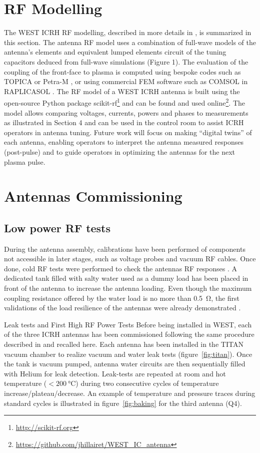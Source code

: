 \documentclass[12p]{iopart}
\begin{document}
\section{RF Modelling}
The WEST ICRH RF modelling, described in more details in \cite{helou2015-2, hillairet2020-2}, is summarized in this section. The antenna RF model uses a combination of full-wave models of the antenna’s elements and equivalent lumped elements circuit of the tuning capacitors deduced from full-wave simulations (Figure 1). The evaluation of the coupling of the front-face to plasma is computed using bespoke codes such as TOPICA \cite{milanesio2009} or Petra-M \cite{bertelli2020, shiraiwa2021}, or using commercial FEM software such as COMSOL in RAPLICASOL \cite{tierens2020-2}. The RF model of a WEST ICRH antenna is built using the open-source Python package scikit-rf\footnote{\url{http://scikit-rf.org}}  and can be found and used online\footnote{\url{https://github.com/jhillairet/WEST_IC_antenna}}. The model allows comparing voltages, currents, powers and phases to measurements as illustrated in Section 4 and can be used in the control room to assist ICRH operators in antenna tuning. Future work will focus on making “digital twins” of each antenna, enabling operators to interpret the antenna measured responses (post-pulse) and to guide operators in optimizing the antennas for the next plasma pulse.

\section{Antennas Commissioning}
\subsection{Low power RF tests}
During the antenna assembly, calibrations have been performed of components not accessible in later stages, such as voltage probes and vacuum RF cables. Once done, cold RF tests were performed to check the antennas RF responses \cite{bernard2019, helou2020}. A dedicated tank filled with salty water used as a dummy load has been placed in front of the antenna to increase the antenna loading. Even though the maximum coupling resistance offered by the water load is no more than \SI{0.5}{\ohm}, the first validations of the load resilience of the antennas were already demonstrated \cite{helou2020}. 

Leak tests and First High RF Power Tests
Before being installed in WEST, each of the three ICRH antennas has been commissioned following the same procedure described in \cite{bernard2019} and recalled here. Each antenna has been installed in the TITAN vacuum chamber \cite{litaudon2013} to realize vacuum and water leak tests (figure~\ref{fig:titan}). Once the tank is vacuum pumped, antenna water circuits are then sequentially filled with Helium for leak detection. Leak-tests are repeated at room and hot temperature ($<\SI{200}{\celsius}$) during two consecutive cycles of temperature increase/plateau/decrease. An example of temperature and pressure traces during standard cycles is illustrated in figure~\ref{fig:baking} for the third antenna (Q4).  
\end{document}
